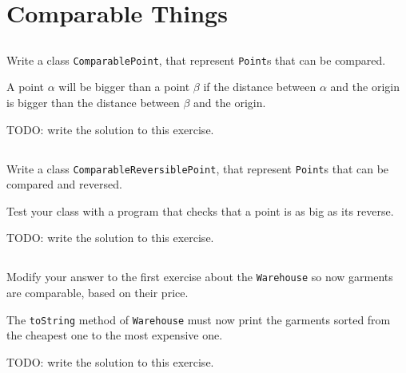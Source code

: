 \documentclass[a4paper, 11pt]{article}
\begin{document}
\section{Comparable Things}

\subsection{}

Write a class \texttt{ComparablePoint}, that represent \texttt{Point}s that can
be compared.

A point $\alpha$ will be bigger than a point $\beta$ if the distance between
$\alpha$ and the origin is bigger than the distance between $\beta$ and the
origin.

\begin{solution}
TODO: write the solution to this exercise.
\end{solution}


\subsection{}

Write a class \texttt{ComparableReversiblePoint}, that represent
\texttt{Point}s that can be compared and reversed.

Test your class with a program that checks that a point is as big as its reverse.

\begin{solution}
TODO: write the solution to this exercise.
\end{solution}


\subsection{}

Modify your answer to the first exercise about the \texttt{Warehouse} so now
garments are comparable, based on their price.

The \texttt{toString} method of \texttt{Warehouse} must now print the garments
sorted from the cheapest one to the most expensive one.

\begin{solution}
TODO: write the solution to this exercise.
\end{solution}
\end{document}

